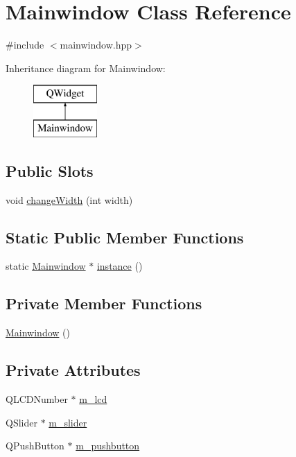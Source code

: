 \hypertarget{class_mainwindow}{}\section{Mainwindow Class Reference}
\label{class_mainwindow}


{\ttfamily \#include $<$mainwindow.\+hpp$>$}

Inheritance diagram for Mainwindow\+:\begin{figure}[H]
\begin{center}
\leavevmode
\includegraphics[height=2.000000cm]{class_mainwindow}
\end{center}
\end{figure}
\subsection*{Public Slots}
\begin{DoxyCompactItemize}
\item 
void \hyperlink{class_mainwindow_ab3176d338d0345c6e777dab74b742a33}{change\+Width} (int width)
\end{DoxyCompactItemize}
\subsection*{Static Public Member Functions}
\begin{DoxyCompactItemize}
\item 
static \hyperlink{class_mainwindow}{Mainwindow} $\ast$ \hyperlink{class_mainwindow_aedafe213d761a416bae8ccaffa6410b0}{instance} ()
\end{DoxyCompactItemize}
\subsection*{Private Member Functions}
\begin{DoxyCompactItemize}
\item 
\hyperlink{class_mainwindow_a9ca049b84f17c87a57b53e418b1c40e3}{Mainwindow} ()
\end{DoxyCompactItemize}
\subsection*{Private Attributes}
\begin{DoxyCompactItemize}
\item 
Q\+L\+C\+D\+Number $\ast$ \hyperlink{class_mainwindow_abd18cf97d805d3ea3c9d00937078b4f4}{m\+\_\+lcd}
\item 
Q\+Slider $\ast$ \hyperlink{class_mainwindow_af706665f6371f479b89bc5cd722191df}{m\+\_\+slider}
\item 
Q\+Push\+Button $\ast$ \hyperlink{class_mainwindow_a64a43df893109c11db9482ba2d7646dc}{m\+\_\+pushbutton}
\end{DoxyCompactItemize}
